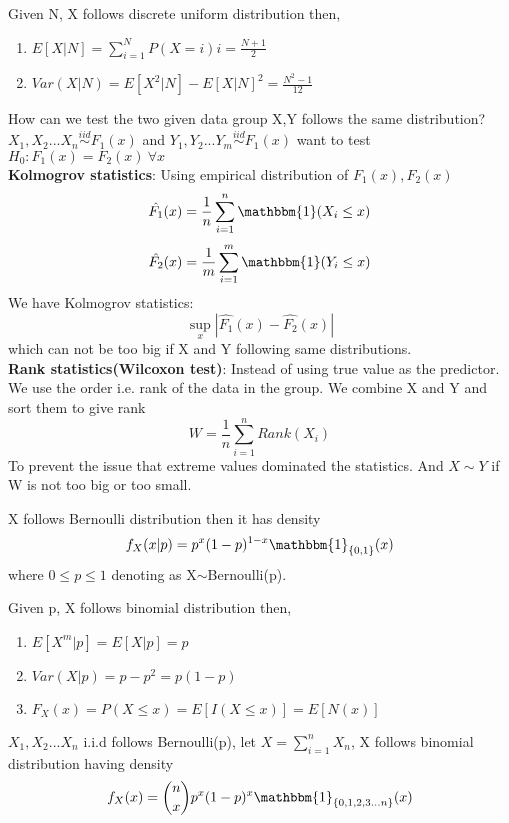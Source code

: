 \documentclass[../Distributions.tex]{subfiles}
\begin{document}
\begin{property}Given N, X follows discrete uniform distribution then,
\begin{enumerate}
\item $E[X|N]=\sum_{i=1}^NP(X=i)i=\frac{N+1}{2}$
\item $Var(X|N)=E[X^2|N]-E[X|N]^2=\frac{N^2-1}{12}$
\end{enumerate}
\end{property}
\begin{intuition}
How can we test the two given data group X,Y follows the same distribution? \\
$X_1,X_2...X_n \overset{iid}{\sim}F_1(x)$ and $Y_1,Y_2...Y_m  \overset{iid}{\sim}F_1(x)$ want to test $H_0:F_1(x)=F_2(x)\ \forall x$\\
{\bf Kolmogrov statistics}:
Using empirical distribution of $F_1(x),F_2(x)$
$$\hat{F_1}(x)=\frac{1}{n}\sum_{i=1}^n\mathbbm{1}(X_i\leq x)$$
$$\hat{F_2}(x)=\frac{1}{m}\sum_{i=1}^m\mathbbm{1}(Y_i\leq x)$$
We have Kolmogrov statistics:$$\sup_x|\hat{F_1}(x)-\hat{F_2}(x)|$$ which can not be too big if X and Y following same distributions.\\
{\bf Rank statistics(Wilcoxon test)}: Instead of using true value as the predictor. We use the order i.e. rank of the data in the group. We combine X and Y and sort them to give rank $$W=\frac{1}{n}\sum_{i=1}^{n}Rank(X_i)$$
To prevent the issue that extreme values dominated the statistics. And $X\sim Y$ if W is not too big or too small. 

\end{intuition}
\begin{definition}X follows Bernoulli distribution then it has density
$$f_X(x|p)=p^x(1-p)^{1-x}\mathbbm{1}_{\{0,1\}}(x)$$
where $0\leq p\leq 1$ denoting as X$\sim$Bernoulli(p).
\end{definition}
\begin{property}Given p, X follows binomial distribution then,
\begin{enumerate}
\item $E[X^m|p]=E[X|p]=p$
\item $Var(X|p)=p-p^2=p(1-p)$
\item $F_X(x)=P(X\leq x)=E[I(X\leq x)]=E[N(x)]$
\end{enumerate}
\end{property}
\begin{definition}$X_1,X_2...X_n$ i.i.d follows Bernoulli(p), let $X=\sum_{i=1}^nX_n$, X follows binomial distribution having density $$f_X(x)=\binom{n}{x}p^x(1-p)^x\mathbbm{1}_{\{0,1,2,3...n\}}(x)$$
\end{definition}
\end{document}
